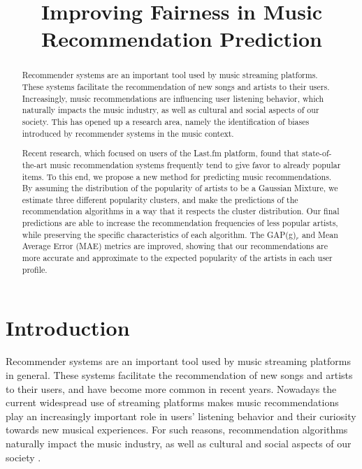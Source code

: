 \documentclass{article}
\title{Improving Fairness in Music Recommendation Prediction}
\begin{document}
%
\maketitle
%
\begin{abstract}


Recommender systems are an important tool used by music streaming
platforms. These systems facilitate the recommendation of new songs
and artists to their users. Increasingly, music recommendations 
are influencing user listening behavior,
which naturally impacts the music
industry, as well as cultural and social aspects of our society. 
This has opened up a research area, namely the identification 
of biases introduced by recommender systems in the music context.

Recent research, which focused on users of 
the Last.fm platform, found that state-of-the-art music recommendation 
systems frequently tend to give favor to already popular items.
To this end, we propose a new method for predicting
music recommendations. By assuming the distribution of
the popularity of artists to be a Gaussian Mixture,
we estimate three different popularity clusters, 
and make the predictions of the recommendation
algorithms in a way that it respects the cluster 
distribution.
Our final predictions are able to increase
the recommendation frequencies of less popular artists, while 
preserving the specific characteristics of each algorithm.
The GAP(g)$_r$ and 
Mean Average Error (MAE)
metrics are improved, showing that our recommendations 
are more accurate and approximate to the expected 
popularity of the artists in each user profile. 



\end{abstract}
%
\section{Introduction}\label{sec:introduction}


Recommender systems are an important tool used by music streaming
platforms in general. These systems facilitate the recommendation
of new songs and artists to their users, and have become more
common in recent years. Nowadays the current
widespread use of streaming platforms makes music
recommendations play an increasingly important role in
users' listening behavior and their curiosity towards new 
musical experiences. For such reasons, 
recommendation algorithms naturally impact the music
industry,
as well as cultural and social aspects of our society \cite{music_taste}. 
\end{document}
